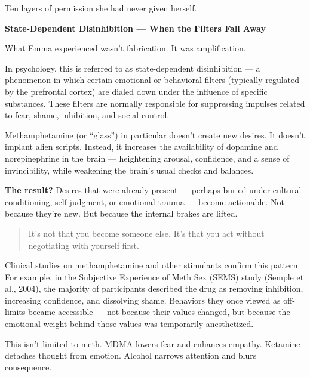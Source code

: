 Ten layers of permission she had never given herself.

\begin{TechnicalSidebar}{\textbf{State-Dependent Disinhibition — When the Filters Fall Away}}

  What Emma experienced wasn’t fabrication. It was amplification.

  \medskip
  
  In psychology, this is referred to as state-dependent disinhibition — a phenomenon in which 
  certain emotional or behavioral filters (typically regulated by the prefrontal cortex) are 
  dialed down under the influence of specific substances. These filters are normally responsible 
  for suppressing impulses related to fear, shame, inhibition, and social control.

  \medskip
  
  Methamphetamine (or “glass”) in particular doesn’t create new desires. It doesn’t implant alien 
  scripts. Instead, it increases the availability of dopamine and norepinephrine in the brain — 
  heightening arousal, confidence, and a sense of invincibility, while weakening the brain’s usual 
  checks and balances.
  
  \medskip
  
  \textbf{The result?}
  Desires that were already present — perhaps buried under cultural conditioning, self-judgment, 
  or emotional trauma — become actionable. Not because they’re new. But because the internal 
  brakes are lifted.
  
  \begin{quote}
  It’s not that you become someone else.
  It’s that you act without negotiating with yourself first.
  \end{quote}
  
  Clinical studies on methamphetamine and other stimulants confirm this pattern. For example, in 
  the Subjective Experience of Meth Sex (SEMS) study (Semple et al., 2004), the majority of 
  participants described the drug as removing inhibition, increasing confidence, and dissolving 
  shame. Behaviors they once viewed as off-limits became accessible — not because their values 
  changed, but because the emotional weight behind those values was temporarily anesthetized.
  
  \medskip
  
  This isn’t limited to meth.
  MDMA lowers fear and enhances empathy.
  Ketamine detaches thought from emotion.
  Alcohol narrows attention and blurs consequence.


\end{TechnicalSidebar}
